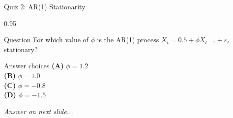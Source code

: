 \documentclass[9pt, aspectratio=169, t]{beamer}
\begin{document}
\begin{frame}{Quiz 2: AR(1) Stationarity}
    \begin{cminipage}{0.95\textwidth}
    \begin{alertblock}{Question}
        For which value of $\phi$ is the AR(1) process $X_t = 0.5 + \phi X_{t-1} + \varepsilon_t$ stationary?
    \end{alertblock}

    \vspace{0.4cm}

    \begin{block}{Answer choices}
        \textcolor{MainBlue}{\textbf{(A)}} $\phi = 1.2$\\[3pt]
        \textcolor{MainBlue}{\textbf{(B)}} $\phi = 1.0$\\[3pt]
        \textcolor{MainBlue}{\textbf{(C)}} $\phi = -0.8$\\[3pt]
        \textcolor{MainBlue}{\textbf{(D)}} $\phi = -1.5$
    \end{block}

    \vspace{0.5cm}

    \begin{center}
        \textit{Answer on next slide...}
    \end{center}
    \end{cminipage}
\end{frame}
\end{document}
